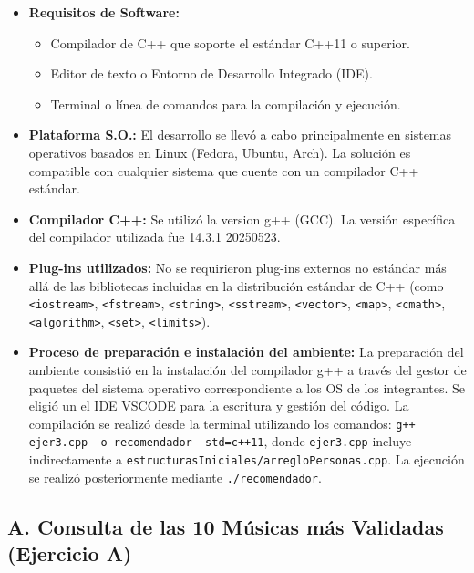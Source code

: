 \documentclass{article}
\begin{document}
\begin{itemize}[label=\textbullet] %
    \item \textbf{Requisitos de Software:}
    \begin{itemize}[label=\textendash] %
        \item Compilador de C++ que soporte el estándar C++11 o superior.
        \item Editor de texto o Entorno de Desarrollo Integrado (IDE).
        \item Terminal o línea de comandos para la compilación y ejecución.
    \end{itemize}
    \item \textbf{Plataforma S.O.:}
    El desarrollo se llevó a cabo principalmente en sistemas operativos basados en Linux (Fedora, Ubuntu, Arch). La solución es compatible con cualquier sistema que cuente con un compilador C++ estándar.
    \item \textbf{Compilador C++:}
    Se utilizó la version g++ (GCC). La versión específica del compilador utilizada fue 14.3.1 20250523.
    \item \textbf{Plug-ins utilizados:}
    No se requirieron plug-ins externos no estándar más allá de las bibliotecas incluidas en la distribución estándar de C++ (como \texttt{<iostream>}, \texttt{<fstream>}, \texttt{<string>}, \texttt{<sstream>}, \texttt{<vector>}, \texttt{<map>}, \texttt{<cmath>}, \texttt{<algorithm>}, \texttt{<set>}, \texttt{<limits>}).
    \item \textbf{Proceso de preparación e instalación del ambiente:}
    La preparación del ambiente consistió en la instalación del compilador g++ a través del gestor de paquetes del sistema operativo correspondiente a los OS de los integrantes.
    Se eligió un el IDE VSCODE para la escritura y gestión del código. La compilación se realizó desde la terminal utilizando los comandos: \texttt{g++ ejer3.cpp -o recomendador -std=c++11}, donde \texttt{ejer3.cpp} incluye indirectamente a \texttt{estructurasIniciales/arregloPersonas.cpp}. La ejecución se realizó posteriormente mediante \texttt{./recomendador}.
\end{itemize}


\subsection{A. Consulta de las 10 Músicas más Validadas (Ejercicio A)}
\end{document}
